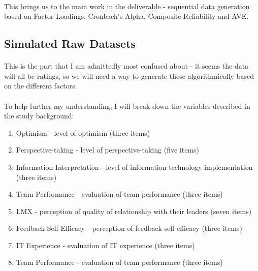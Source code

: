 \documentclass{article}
\begin{document}
\paragraph{}
This brings us to the main work in the deliverable - sequential data generation based on Factor Loadings, Cronbach's Alpha, Composite Reliability and AVE.

\subsection{Simulated Raw Datasets}

\paragraph{}
This is the part that I am admittedly most confused about - it seems the data will all be ratings, so we will need a way to generate these algorithmically based on the different factors.

\paragraph{}
To help further my understanding, I will break down the variables described in the study background:

\begin{enumerate}

\item Optimism - level of optimism (three items)

\item Perspective-taking - level of perspective-taking (five items)

\item Information Interpretation - level of information technology implementation (three items)

\item Team Performance - evaluation of team performance (three items)

\item LMX - perception of quality of relationship with their leaders (seven items)

\item Feedback Self-Efficacy - perception of feedback self-efficacy (three items)

\item IT Experience - evaluation of IT experience (three items)

\item Team Performance - evaluation of team performance (three items)

\end{enumerate}
\end{document}
